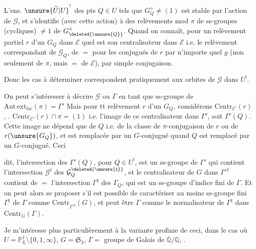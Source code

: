 
L'ens. $\unsure{\widetilde U|U}^{!}$ des pts $Q\in U$ tels que $G_Q^+\ne(1)$ est stable par l'action de $\mathcal G$, et s'identifie (avec cette action) à  des relèvements  mod $\pi$ de ss-groupes (cycliques) $\ne1$ de $G^{+}_{\deleted{\unsure{Q}}}$. Quand on connaît, pour un relèvement partiel $r$ d'un $G_Q$ dans $\mathcal E$ quel est son centralisateur dans $\mathcal E$ i.e. le relèvement correspondant de $\mathcal G_Q$,  de $=$ pour les conjugués de $r$ par n'importe quel  $g$ (non seulement de $\pi$, mais $=$ de $\mathcal E$), par simple conjugaison.

Donc les cas à déterminer correspondent pratiquement aux orbites de $\mathcal G$ dans $U^{!}$.

On peut s'intéresser à décrire $\mathcal G$ ou $\Gamma$ en tant que ss-groupe de $\mathrm{Aut\,ext}_{\mathrm{lac}}(\pi)=\Gamma'$  Mais pour tt relèvement $r$ d'un $G_Q$, considérons $\mathrm{Centr}_{\mathcal E'}(r)$,  .  $\mathrm{Centr}_{\mathcal E'}(r)\cap\pi=(1)$ i.e.  l'image de ce centralisateur dans $\Gamma'$, soit $\Gamma'(Q)$. Cette image ne dépend que de $Q$ i.e. de la classe de $\pi$-conjugaison de $r$ ou de $r(\unsure{G_Q})$, et est remplacée par un $G$-conjugué quand $Q$ est remplacé par un $G$-conjugué. Ceci



dit, l'intersection  des $\Gamma'(Q)$, pour $Q\in U^{!}$, est un ss-groupe de $\Gamma'$ qui contient l'intersection  $\mathcal G^{\natural}$ des $\mathcal G_Q^{\deleted{\unsure{\natural}}}$, et le centralisateur de $G$ dans $\Gamma'^{\natural}$ contient de $=$ l'intersection  $\Gamma^{\natural}$ des $\Gamma_Q$, qui est un ss-groupe  d'indice fini de $\Gamma$. Et on peut alors se proposer s'il est possible de caractériser au moins  ss-groupe fini $\Gamma^{\natural}$ de $\Gamma$ comme $\mathrm{Centr}_{\Gamma'^{\natural}}(G)$, et  peut être $\Gamma$ comme le normalisateur de $\Gamma^{\natural}$ dans  $\mathrm{Centr}_{G}(\Gamma)$.

Je m'intéresse plus particulièrement à la variante profinie de ceci, dans le cas où $U=\mathbb P^1_{\mathbb Q}\setminus\{0,1,\infty\}$, $G=\mathfrak S_3$, $\Gamma={}$ groupe de Galois de $\overline{\mathbb Q}/\mathbb Q$,  .

